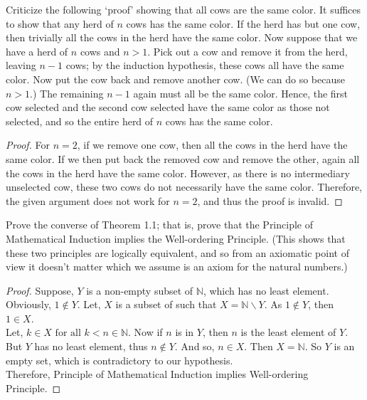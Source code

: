\documentclass[12pt]{article}
\newenvironment{problem}[2][Problem]{\begin{trivlist}
\item[\hskip \labelsep {\bfseries #1}\hskip \labelsep {\bfseries #2.}]}{\end{trivlist}}
\begin{document}
\begin{problem}{15}
Criticize the following `proof' showing that all cows are the same color. It suffices to show that any herd of \( n \) cows has the same color. If the herd has but one cow, then trivially all the cows in the herd have the same color. Now suppose that we have a herd of \( n \) cows and \( n > 1 \). Pick out a cow and remove it from the herd, leaving \( n - 1 \) cows; by the induction hypothesis, these cows all have the same color. Now put the cow back and remove another cow. (We can do so because \( n > 1 \).) The remaining \( n - 1 \) again must all be the same color. Hence, the first cow selected and the second cow selected have the same color as those not selected, and so the entire herd of \( n \) cows has the same color.

\end{problem}

\begin{proof}
	For \( n = 2 \), if we remove one cow, then all the cows in the herd have the same color. If we then put back the removed cow and remove the other, again all the cows in the herd have the same color. However, as there is no intermediary unselected cow, these two cows do not necessarily have the same color. Therefore, the given argument does not work for \( n = 2 \), and thus the proof is invalid.

\end{proof}

\begin{problem}{16}
Prove the converse of Theorem 1.1; that is, prove that the Principle of Mathematical Induction implies the Well-ordering Principle. (This shows that these two principles are logically equivalent, and so from an axiomatic point of view it doesn't matter which we assume is an axiom for the natural numbers.)

\end{problem}

\begin{proof}
	Suppose, $Y$ is a non-empty subset of $\mathbb{N}$, which has no least element. Obviously, $1 \not \in Y$. Let, $X$ is a subset of such that $X = \mathbb{N}\backslash Y$. As $1 \not \in Y$, then $1 \in X.$ \\
	Let, $k \in X \text{ for all } k < n \in \mathbb{N}$. Now if $n$ is in $Y$, then $n$ is the least element of $Y$. But $Y$ has no least element, thus $n \not \in Y$. And so, $n \in X$. Then $X = \mathbb{N}$. So $Y$ is an empty set, which is contradictory to our hypothesis.\\
	Therefore, Principle of Mathematical Induction implies Well-ordering Principle.

\end{proof}
\end{document}
